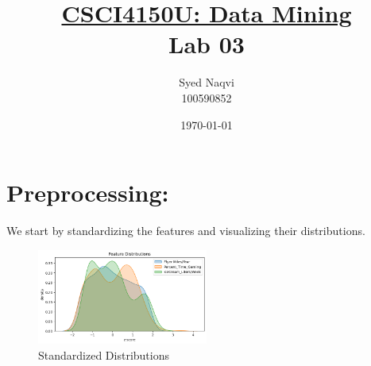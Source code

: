 \documentclass{article}
\title{\textbf{\underline{CSCI4150U: Data Mining}\\Lab 03}}
\author{Syed Naqvi\\100590852}
\date{\today}
\begin{document}
    \maketitle
    

    \section*{Preprocessing:}

    We start by standardizing the features and visualizing their distributions.

    \begin{figure}[H]
        \centering
        \includegraphics[width=0.5\textwidth, height=0.21\textheight]{pre_a.png}
        \caption{\small{Standardized Distributions}}
    \end{figure}
\end{document}
